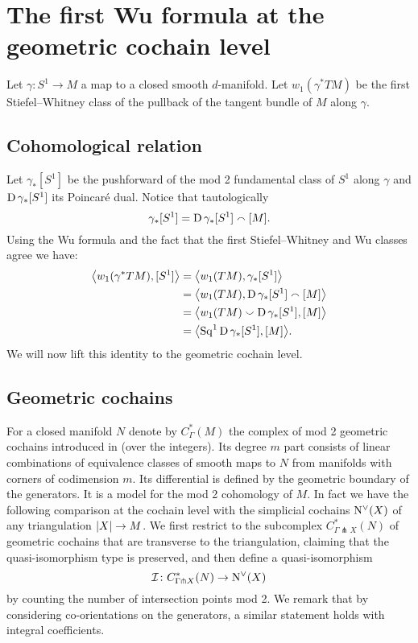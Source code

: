 
\section*{The first Wu formula at the geometric cochain level} \label{s:statement}

\vspace*{10pt}

Let $\gamma \colon S^1 \to M$ a map to a closed smooth $d$-manifold.
Let $w_1(\gamma^\ast TM)$ be the first Stiefel--Whitney class of the pullback of the tangent bundle of $M$ along $\gamma$.

\subsection*{Cohomological relation}

Let $\gamma_\ast[S^1]$ be the pushforward of the mod 2 fundamental class of $S^1$ along $\gamma$ and $\dual \gamma_\ast[S^1]$ its Poincar\'e dual.
Notice that tautologically
\[
\gamma_\ast[S^1] = \dual \gamma_\ast[S^1] \smallfrown [M].
\]
Using the Wu formula and the fact that the first Stiefel--Whitney and Wu classes agree we have:
\begin{align*}
	\angles[\big]{w_1(\gamma^\ast TM), [S^1]} &=
	\angles[\big]{w_1(TM), \gamma_\ast [S^1]} \\ &=
	\angles[\big]{w_1(TM), \dual \gamma_\ast[S^1] \smallfrown [M]} \\ &=
	\angles[\big]{w_1(TM) \smallsmile \dual \gamma_\ast[S^1], [M]} \\ &=
	\angles[\big]{\Sq^1 \dual \gamma_\ast[S^1], [M]}.
\end{align*}
We will now lift this identity to the geometric cochain level.

\subsection*{Geometric cochains}

For a closed manifold $N$ denote by $C^*_{\Gamma}(M)$ the complex of mod 2 geometric cochains introduced in \cite{medina2021flowing} (over the integers).
Its degree $m$ part consists of linear combinations of equivalence classes of smooth maps to $N$ from manifolds with corners of codimension $m$.
Its differential is defined by the geometric boundary of the generators.
It is a model for the mod 2 cohomology of $M$.
In fact we have the following comparison at the cochain level with the simplicial cochains $\cochains(X)$ of any triangulation $\bars{X} \to M$.
We first restrict to the subcomplex $C^*_{\Gamma \pitchfork X}(N)$ of geometric cochains that are transverse to the triangulation, claiming that the quasi-isomorphism type is preserved, and then define a quasi-isomorphism
\[
\cI \colon C^*_{\Gamma \pitchfork X}(N) \to \cochains(X)
\]
by counting the number of intersection points mod 2.
We remark that by considering co-orientations on the generators, a similar statement holds with integral coefficients.

